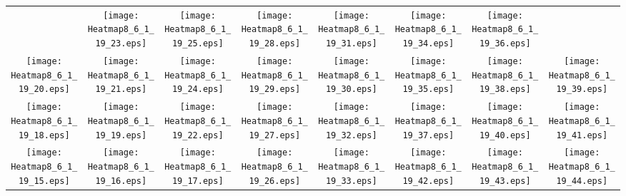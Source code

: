 \documentclass{standalone}
\begin{document}
\renewcommand{\arraystretch}{0}
\setlength{\tabcolsep}{0pt}
\begin{tabular}{ *8{c} }
 & \texttt{[image: Heatmap8\_6\_1\_19\_23.eps]} & \texttt{[image: Heatmap8\_6\_1\_19\_25.eps]} & \texttt{[image: Heatmap8\_6\_1\_19\_28.eps]} & \texttt{[image: Heatmap8\_6\_1\_19\_31.eps]} & \texttt{[image: Heatmap8\_6\_1\_19\_34.eps]} & \texttt{[image: Heatmap8\_6\_1\_19\_36.eps]} &  \\
\texttt{[image: Heatmap8\_6\_1\_19\_20.eps]} & \texttt{[image: Heatmap8\_6\_1\_19\_21.eps]} & \texttt{[image: Heatmap8\_6\_1\_19\_24.eps]} & \texttt{[image: Heatmap8\_6\_1\_19\_29.eps]} & \texttt{[image: Heatmap8\_6\_1\_19\_30.eps]} & \texttt{[image: Heatmap8\_6\_1\_19\_35.eps]} & \texttt{[image: Heatmap8\_6\_1\_19\_38.eps]} & \texttt{[image: Heatmap8\_6\_1\_19\_39.eps]} \\
\texttt{[image: Heatmap8\_6\_1\_19\_18.eps]} & \texttt{[image: Heatmap8\_6\_1\_19\_19.eps]} & \texttt{[image: Heatmap8\_6\_1\_19\_22.eps]} & \texttt{[image: Heatmap8\_6\_1\_19\_27.eps]} & \texttt{[image: Heatmap8\_6\_1\_19\_32.eps]} & \texttt{[image: Heatmap8\_6\_1\_19\_37.eps]} & \texttt{[image: Heatmap8\_6\_1\_19\_40.eps]} & \texttt{[image: Heatmap8\_6\_1\_19\_41.eps]} \\
\texttt{[image: Heatmap8\_6\_1\_19\_15.eps]} & \texttt{[image: Heatmap8\_6\_1\_19\_16.eps]} & \texttt{[image: Heatmap8\_6\_1\_19\_17.eps]} & \texttt{[image: Heatmap8\_6\_1\_19\_26.eps]} & \texttt{[image: Heatmap8\_6\_1\_19\_33.eps]} & \texttt{[image: Heatmap8\_6\_1\_19\_42.eps]} & \texttt{[image: Heatmap8\_6\_1\_19\_43.eps]} & \texttt{[image: Heatmap8\_6\_1\_19\_44.eps]} \\

\end{tabular}
\end{document}
